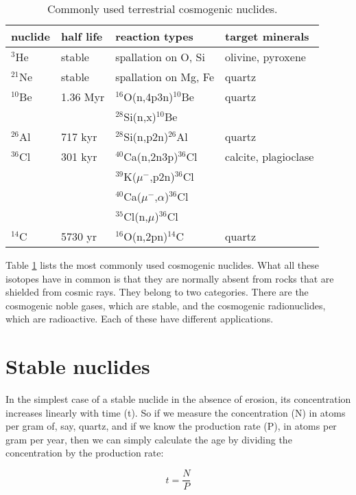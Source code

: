 \begin{table}[!ht]
\centering
\begin{tabular}{l@{~}l@{~}l@{~}l}
nuclide & half life & reaction types & target minerals \\
\hline
$^3$He & stable & spallation on O, Si & olivine, pyroxene \\
$^{21}$Ne & stable & spallation on Mg, Fe & quartz \\
$^{10}$Be & 1.36 Myr & $^{16}$O(n,4p3n)$^{10}$Be & quartz \\
~ & ~ & $^{28}$Si(n,x)$^{10}$Be & ~ \\
$^{26}$Al & 717 kyr & $^{28}$Si(n,p2n)$^{26}$Al & quartz\\
$^{36}$Cl & 301 kyr & $^{40}$Ca(n,2n3p)$^{36}$Cl & calcite, plagioclase\\
~ & ~ & $^{39}$K($\mu^-$,p2n)$^{36}$Cl & ~ \\
~ & ~ & $^{40}$Ca($\mu^-$,$\alpha$)$^{36}$Cl & ~ \\
~ & ~ & $^{35}$Cl(n,$\mu$)$^{36}$Cl & ~ \\
$^{14}$C & 5730 yr & $^{16}$O(n,2pn)$^{14}$C & quartz\\
\end{tabular}
\caption{Commonly used terrestrial cosmogenic nuclides.}
\label{tab:cosmo}
\end{table}

Table \ref{tab:cosmo} lists the most commonly used cosmogenic
nuclides. What all these isotopes have in common is that they are
normally absent from rocks that are shielded from cosmic rays. They
belong to two categories. There are the cosmogenic noble gases, which
are stable, and the cosmogenic radionuclides, which are
radioactive. Each of these have different applications.

\section{Stable nuclides}

In the simplest case of a stable nuclide in the absence of erosion,
its concentration increases linearly with time (t). So if we measure
the concentration (N) in atoms per gram of, say, quartz, and if we
know the production rate (P), in atoms per gram per year, then we can
simply calculate the age by dividing the concentration by the
production rate:

\begin{equation}
t = \frac{N}{P}
\label{eq:cosmo-exposure}
\end{equation}


